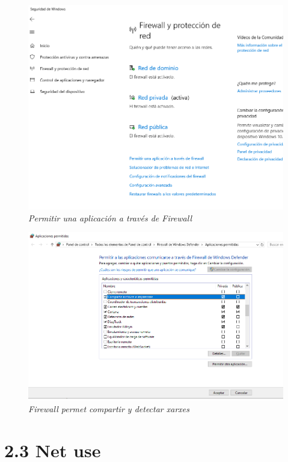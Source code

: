 \documentclass[
  a4paper,
]{article}
\begin{document}
\begin{figure}
\centering
\includegraphics{png/ADDS/PermitirUnaAplicacionATravesdeFirewall.png}
\caption{\emph{Permitir una aplicación a través de Firewall}}
\end{figure}

\begin{figure}
\centering
\includegraphics{png/ADDS/FirewallCompartiryDetectar.png}
\caption{\emph{Firewall permet compartir y detectar xarxes}}
\end{figure}

\section{2.3 Net use}\label{net-use}
\end{document}
